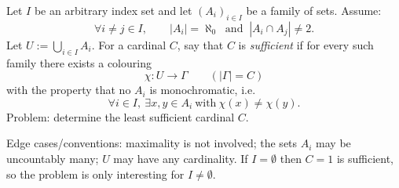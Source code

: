 Let $I$ be an arbitrary index set and let $(A_i)_{i\in I}$ be a family of sets.
Assume:
\[
\forall i\neq j\in I,\qquad |A_i|=\aleph_0\ \text{ and }\ |A_i\cap A_j|\neq 2.
\]
Let $U:=\bigcup_{i\in I}A_i$.
For a cardinal $C$, say that $C$ is \emph{sufficient} if for every such family there exists a colouring
\[
\chi:U\to \Gamma\qquad (|\Gamma|=C)
\]
with the property that no $A_i$ is monochromatic, i.e.
\[
\forall i\in I,\ \exists x,y\in A_i\ \text{with}\ \chi(x)\neq \chi(y).
\]
Problem: determine the least sufficient cardinal $C$.

Edge cases/conventions: maximality is not involved; the sets $A_i$ may be uncountably many; $U$ may have any cardinality. If $I=\emptyset$ then $C=1$ is sufficient, so the problem is only interesting for $I\neq\emptyset$.
